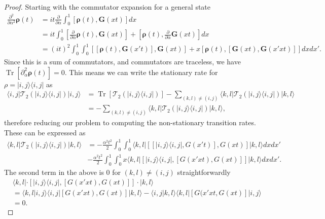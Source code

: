 \documentclass[
 amsmath,amssymb,
 aps,
onecolumn, 
nofootinbib]{revtex4-2}
\newcommand{\ket}[1]{|#1\rangle}
\newcommand{\bra}[1]{\langle #1|}
\newcommand{\braket}[2]{\langle #1|#2\rangle}
\newcommand{\ketbra}[2]{| #1\rangle\! \langle #2|}
\DeclareMathOperator{\Tr}{Tr}
\begin{document}
\begin{proof}
    Starting with the commutator expansion for a general state
    \begin{align}
        \frac{\partial^2}{\partial \alpha^2} \boldsymbol{\rho}(t) &= it \frac{\partial}{\partial \alpha} \int_0^1 [\boldsymbol{\rho}(t), \boldsymbol{G}(x t)] d x \\
        &= it \int_0^1 \left[\frac{\partial}{\partial \alpha} \boldsymbol{\rho}(t), \boldsymbol{G}(xt)  \right] + \left[\boldsymbol{\rho}(t), \frac{\partial}{\partial \alpha} \boldsymbol{G}(x t)\right] dx \\
        &= (i t)^2 \int_0^1 \int_0^1 [[\boldsymbol{\rho}(t), \boldsymbol{G}(x' t)], \boldsymbol{G}(x t)] + x [\boldsymbol{\rho}(t), [\boldsymbol{G}(x t), \boldsymbol{G}(x' x t)]] dx dx'. \label{eq:second_order_derivative_new_1}
    \end{align}
    Since this is a sum of commutators, and commutators are traceless, we have $\Tr [\partial_\alpha^2 \boldsymbol{\rho}(t) ] = 0$. This means we can write the stationary rate for $\rho = \ketbra{i,j}{i,j}$ as 
    \begin{align}
        \bra{i,j} \mathcal{T}_2 (\ketbra{i,j}{i,j}) \ket{i,j} &= \Tr[\mathcal{T}_2(\ketbra{i,j}{i,j})] - \sum_{(k,l) \neq (i,j)} \bra{k,l} \mathcal{T}_2 (\ketbra{i,j}{i,j}) \ket{k,l} \\
        &= - \sum_{(k,l) \neq (i,j)} \bra{k,l} \mathcal{T}_2 (\ketbra{i,j}{i,j}) \ket{k,l},
    \end{align}
    therefore reducing our problem to computing the non-stationary transition rates. These can be expressed as
    \begin{align}
        \bra{k,l} \mathcal{T}_2(\ketbra{i, j}{i, j}) \ket{k,l} &= - \frac{\alpha^2 t^2}{2} \int_0^1 \int_0^1 \bra{k, l} [[\ketbra{i,j}{i,j}, G(x' t)], G(x t)] \ket{k,l} dx dx' \\
        &- \frac{\alpha^2 t^2}{2} \int_0^1 \int_0^1 x \bra{k,l} [\ketbra{i,j}{i, j}, [G(x' xt), G(x t)]] \ket{k, l} dx dx'. \label{eq:second_order_new_1}
    \end{align}
    The second term in the above is 0 for $(k, l) \neq (i,j)$ straightforwardly
    \begin{align}
        &\bra{k,l} \cdot [\ketbra{i,j}{i,j}, [G(x' x t), G(x t)]] \cdot \ket{k,l} \\
        &= \braket{k,l}{i,j} \bra{i,j} [G(x' x t), G(xt)] \ket{k,l} - \braket{i,j}{k,l} \bra{k, l} [G(x' x t, G(xt)] \ket{i,j} \\
        &= 0.

\end{align}
\end{proof}
\end{document}
